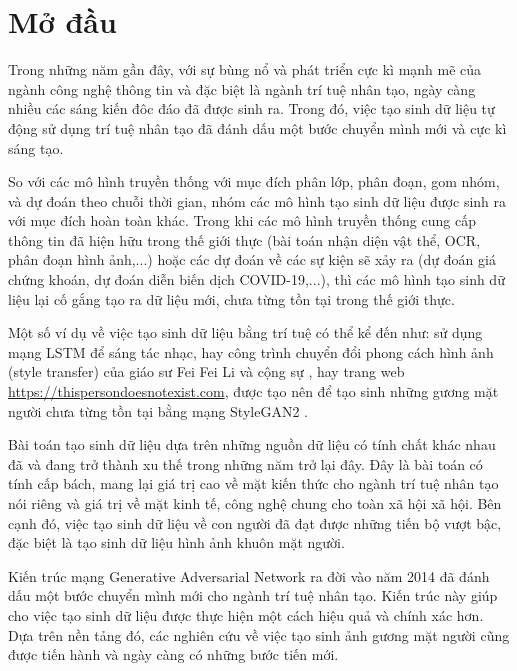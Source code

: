 \section{\texorpdfstring{Mở đầu}{open}}

Trong những năm gần đây, với sự bùng nổ và phát triển cực kì mạnh mẽ của ngành công nghệ thông tin và đặc biệt là ngành trí tuệ nhân tạo, ngày càng nhiều các sáng kiến đôc đáo đã được sinh ra. Trong đó, việc tạo sinh dữ liệu tự động sử dụng trí tuệ nhân tạo đã đánh dấu một bước chuyển mình mới và cực kì sáng tạo.

So với các mô hình truyền thống với mục đích phân lớp, phân đoạn, gom nhóm, và dự đoán theo chuỗi thời gian, nhóm các mô hình tạo sinh dữ liệu được sinh ra với mục đích hoàn toàn khác. Trong khi các mô hình truyền thống cung cấp thông tin đã hiện hữu trong thế giới thực (bài toán nhận diện vật thể, OCR, phân đoạn hình ảnh,...) hoặc các dự đoán về các sự kiện sẽ xảy ra (dự đoán giá chứng khoán, dự đoán diễn biến dịch COVID-19,...), thì các mô hình tạo sinh dữ liệu lại cố gắng tạo ra dữ liệu mới, chưa từng tồn tại trong thế giới thực.

Một số ví dụ về việc tạo sinh dữ liệu bằng trí tuệ có thể kể đến như: sử dụng mạng LSTM để sáng tác nhạc, hay công trình chuyển đổi phong cách hình ảnh (style transfer) của giáo sư Fei Fei Li và cộng sự \cite{Johnson2016Perceptual}, hay trang web \url{https://thispersondoesnotexist.com}, được tạo nên để tạo sinh những gương mặt người chưa từng tồn tại bằng mạng StyleGAN2 \cite{stylegans}.

Bài toán tạo sinh dữ liệu dựa trên những nguồn dữ liệu có tính chất khác nhau đã và đang trở thành xu thế trong những năm trở lại đây. Đây là bài toán có tính cấp bách, mang lại giá trị cao về mặt kiến thức cho ngành trí tuệ nhân tạo nói riêng và giá trị về mặt kinh tế, công nghệ chung cho toàn xã hội xã hội. Bên cạnh đó, việc tạo sinh dữ liệu về con người đã đạt được những tiến bộ vượt bậc, đặc biệt là tạo sinh dữ liệu hình ảnh khuôn mặt người.

Kiến trúc mạng Generative Adversarial Network \cite{gans_base} ra đời vào năm 2014 đã đánh dấu một bước chuyển mình mới cho ngành trí tuệ nhân tạo. Kiến trúc này giúp cho việc tạo sinh dữ liệu được thực hiện một cách hiệu quả và chính xác hơn. Dựa trên nền tảng đó, các nghiên cứu về việc tạo sinh ảnh gương mặt người cũng được tiến hành và ngày càng có những bước tiến mới.

